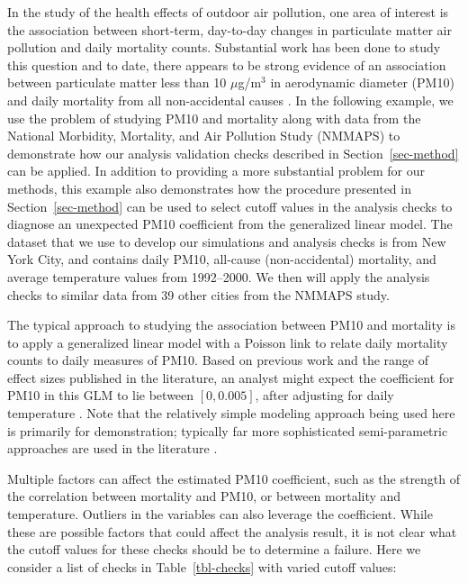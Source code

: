 \documentclass[
  12pt,
]{interact}
\begin{document}
In the study of the health effects of outdoor air pollution, one area of
interest is the association between short-term, day-to-day changes in
particulate matter air pollution and daily mortality counts. Substantial
work has been done to study this question and to date, there appears to
be strong evidence of an association between particulate matter less
than 10 \(\mu\)g/m\(^3\) in aerodynamic diameter (PM10) and daily
mortality from all non-accidental causes \citep{samet2000fine}. In the
following example, we use the problem of studying PM10 and mortality
along with data from the National Morbidity, Mortality, and Air
Pollution Study (NMMAPS) to demonstrate how our analysis validation
checks described in Section~\ref{sec-method} can be applied. In addition
to providing a more substantial problem for our methods, this example
also demonstrates how the procedure presented in
Section~\ref{sec-method} can be used to select cutoff values in the
analysis checks to diagnose an unexpected PM10 coefficient from the
generalized linear model. The dataset that we use to develop our
simulations and analysis checks is from New York City, and contains
daily PM10, all-cause (non-accidental) mortality, and average
temperature values from 1992--2000. We then will apply the analysis
checks to similar data from 39 other cities from the NMMAPS study.

The typical approach to studying the association between PM10 and
mortality is to apply a generalized linear model with a Poisson link to
relate daily mortality counts to daily measures of PM10. Based on
previous work and the range of effect sizes published in the literature,
an analyst might expect the coefficient for PM10 in this GLM to lie
between \([0, 0.005]\), after adjusting for daily temperature
\citep{samet2000fine, welty2005acute}. Note that the relatively simple
modeling approach being used here is primarily for demonstration;
typically far more sophisticated semi-parametric approaches are used in
the literature \citep{peng2006model}.

Multiple factors can affect the estimated PM10 coefficient, such as the
strength of the correlation between mortality and PM10, or between
mortality and temperature. Outliers in the variables can also leverage
the coefficient. While these are possible factors that could affect the
analysis result, it is not clear what the cutoff values for these checks
should be to determine a failure. Here we consider a list of checks in
Table~\ref{tbl-checks} with varied cutoff values:
\end{document}
